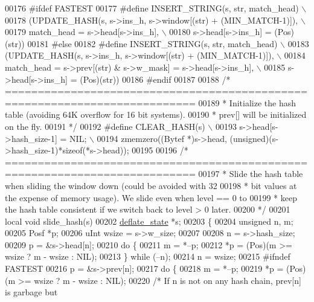 \begin{DoxyCode}
00176 \textcolor{preprocessor}{#ifdef FASTEST}
00177 \textcolor{preprocessor}{#define INSERT\_STRING(s, str, match\_head) \(\backslash\)}
00178 \textcolor{preprocessor}{   (UPDATE\_HASH(s, s->ins\_h, s->window[(str) + (MIN\_MATCH-1)]), \(\backslash\)}
00179 \textcolor{preprocessor}{    match\_head = s->head[s->ins\_h], \(\backslash\)}
00180 \textcolor{preprocessor}{    s->head[s->ins\_h] = (Pos)(str))}
00181 \textcolor{preprocessor}{#else}
00182 \textcolor{preprocessor}{#define INSERT\_STRING(s, str, match\_head) \(\backslash\)}
00183 \textcolor{preprocessor}{   (UPDATE\_HASH(s, s->ins\_h, s->window[(str) + (MIN\_MATCH-1)]), \(\backslash\)}
00184 \textcolor{preprocessor}{    match\_head = s->prev[(str) & s->w\_mask] = s->head[s->ins\_h], \(\backslash\)}
00185 \textcolor{preprocessor}{    s->head[s->ins\_h] = (Pos)(str))}
00186 \textcolor{preprocessor}{#endif}
00187 
00188 \textcolor{comment}{/* ===========================================================================}
00189 \textcolor{comment}{ * Initialize the hash table (avoiding 64K overflow for 16 bit systems).}
00190 \textcolor{comment}{ * prev[] will be initialized on the fly.}
00191 \textcolor{comment}{ */}
00192 \textcolor{preprocessor}{#define CLEAR\_HASH(s) \(\backslash\)}
00193 \textcolor{preprocessor}{    s->head[s->hash\_size-1] = NIL; \(\backslash\)}
00194 \textcolor{preprocessor}{    zmemzero((Bytef *)s->head, (unsigned)(s->hash\_size-1)*sizeof(*s->head));}
00195 
00196 \textcolor{comment}{/* ===========================================================================}
00197 \textcolor{comment}{ * Slide the hash table when sliding the window down (could be avoided with 32}
00198 \textcolor{comment}{ * bit values at the expense of memory usage). We slide even when level == 0 to}
00199 \textcolor{comment}{ * keep the hash table consistent if we switch back to level > 0 later.}
00200 \textcolor{comment}{ */}
00201 local \textcolor{keywordtype}{void} slide\_hash(s)
00202     \hyperlink{structinternal__state}{deflate\_state} *s;
00203 \{
00204     \textcolor{keywordtype}{unsigned} n, m;
00205     Posf *p;
00206     uInt wsize = s->w\_size;
00207 
00208     n = s->hash\_size;
00209     p = &s->head[n];
00210     \textcolor{keywordflow}{do} \{
00211         m = *--p;
00212         *p = (Pos)(m >= wsize ? m - wsize : NIL);
00213     \} \textcolor{keywordflow}{while} (--n);
00214     n = wsize;
00215 \textcolor{preprocessor}{#ifndef FASTEST}
00216     p = &s->prev[n];
00217     \textcolor{keywordflow}{do} \{
00218         m = *--p;
00219         *p = (Pos)(m >= wsize ? m - wsize : NIL);
00220         \textcolor{comment}{/* If n is not on any hash chain, prev[n] is garbage but}

\end{DoxyCode}
